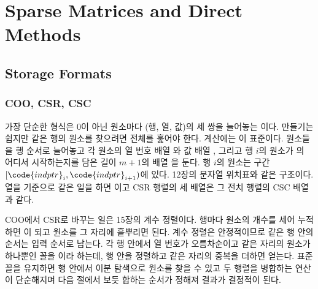 \chapter{Sparse Matrices and Direct Methods}
\label{ch:sparse}


\section{Storage Formats}
\label{sec:sparse-formats}

\subsection{COO, CSR, CSC}

가장 단순한 형식은 $0$이 아닌 원소마다 (행, 열, 값)의 세 쌍을 늘어놓는 이다. 만들기는 쉽지만 같은 행의 원소를 찾으려면 전체를 훑어야 한다. 계산에는 이 표준이다. 원소들을 행 순서로 늘어놓고 각 원소의 열 번호 배열 와 값 배열 , 그리고 행 $i$의 원소가 의 어디서 시작하는지를 담은 길이 $m+1$의 배열 을 둔다. 행 $i$의 원소는 구간 $[\code{indptr}_i,\code{indptr}_{i+1})$에 있다. 12장의 문자열 위치표와 같은 구조이다. 열을 기준으로 같은 일을 하면 이고 CSR 행렬의 세 배열은 그 전치 행렬의 CSC 배열과 같다.

COO에서 CSR로 바꾸는 일은 15장의 계수 정렬이다. 행마다 원소의 개수를 세어 누적하면 이 되고 원소를 그 자리에 흩뿌리면 된다. 계수 정렬은 안정적이므로 같은 행 안의 순서는 입력 순서로 남는다. 각 행 안에서 열 번호가 오름차순이고 같은 자리의 원소가 하나뿐인 꼴을 이라 하는데, 행 안을 정렬하고 같은 자리의 중복을 더하면 얻는다. 표준 꼴을 유지하면 행 안에서 이분 탐색으로 원소를 찾을 수 있고 두 행렬을 병합하는 연산이 단순해지며 다음 절에서 보듯 합하는 순서가 정해져 결과가 결정적이 된다.

